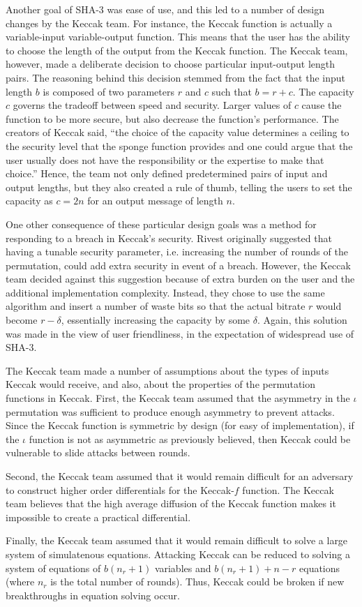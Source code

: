 \documentclass[psamsfonts]{amsart}
\begin{document}
Another goal of SHA-3 was ease of use, and this led to a number of design changes by the Keccak team. For instance, the Keccak function is actually a variable-input variable-output function. This means that the user has the ability to choose the length of the output from the Keccak function. The Keccak team, however, made a deliberate decision to choose particular input-output length pairs. The reasoning behind this decision stemmed from the fact that the input length $b$ is composed of two parameters $r$ and $c$ such that $b = r + c$. The capacity $c$ governs the tradeoff between speed and security. Larger values of $c$ cause the function to be more secure, but also decrease the function's performance. The creators of Keccak said, ``the choice of the capacity value determines a ceiling to the security level that the sponge function provides and one could argue that the user usually does not have the responsibility or the expertise to make that choice.'' Hence, the team not only defined predetermined pairs of input and output lengths, but they also created a rule of thumb, telling the users to set the capacity as $c = 2n$ for an output message of length $n$.

One other consequence of these particular design goals was a method for responding to a breach in Keccak's security. Rivest originally suggested that having a tunable security parameter, i.e. increasing the number of rounds of the permutation, could add extra security in event of a breach. However, the Keccak team decided against this suggestion because of extra burden on the user and the additional implementation complexity. Instead, they chose to use the same algorithm and insert a number of waste bits so that the actual bitrate $r$ would become $r - \delta$, essentially increasing the capacity by some $\delta$. Again, this solution was made in the view of user friendliness, in the expectation of widespread use of SHA-3.

The Keccak team made a number of assumptions about the types of inputs Keccak would receive, and also, about the properties of the permutation functions in Keccak. First, the Keccak team assumed that the asymmetry in the $\iota$ permutation was sufficient to produce enough asymmetry to prevent attacks. Since the Keccak function is symmetric by design (for easy of implementation), if the $\iota$ function is not as asymmetric as previously believed, then Keccak could be vulnerable to slide attacks between rounds.

Second, the Keccak team assumed that it would remain difficult for an adversary to construct higher order differentials for the Keccak-$f$ function. The Keccak team believes that the high average diffusion of the Keccak function makes it impossible to create a practical differential.

Finally, the Keccak team assumed that it would remain difficult to solve a large system of simulatenous equations. Attacking Keccak can be reduced to solving a system of equations of $b(n_r + 1)$ variables and $b(n_r+1) + n -r$ equations (where $n_r$ is the total number of rounds). Thus, Keccak could be broken if new breakthroughs in equation solving occur.
\end{document}
